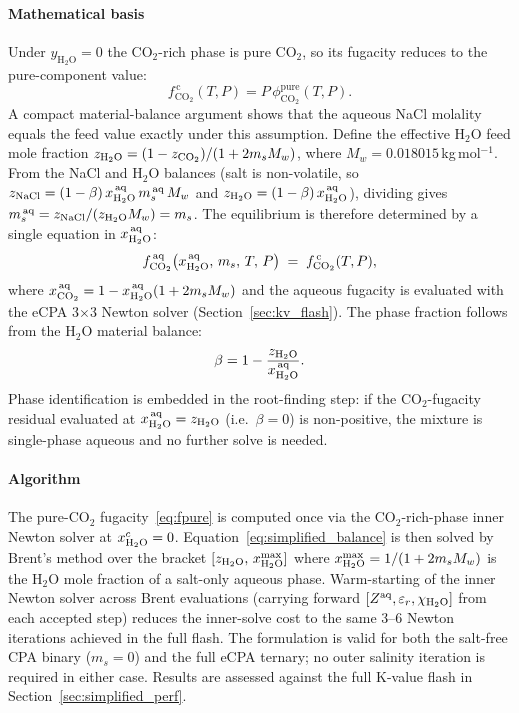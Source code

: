 \documentclass[preprint,12pt,number]{elsarticle}
\begin{document}
\paragraph{Mathematical basis}
Under $y_{\text{H}_2\text{O}} = 0$ the CO$_2$-rich phase is pure CO$_2$, so its fugacity
reduces to the pure-component value:
\begin{equation}
  f_{\text{CO}_2}^{\,\text{c}}(T,P) = P\,\phi_{\text{CO}_2}^{\text{pure}}(T,P).
  \label{eq:fpure}
\end{equation}
A compact material-balance argument shows that the aqueous NaCl molality equals the feed
value exactly under this assumption.
Define the effective H$_2$O feed mole fraction
$z_{\rm H_2O} = (1-z_{\text{CO}_2})/(1+2m_sM_w)$, where $M_w = 0.018015$\,kg\,mol$^{-1}$.
From the NaCl and H$_2$O balances (salt is non-volatile, so
$z_{\text{NaCl}} = (1-\beta)\,x_{\rm H_2O}^{\,\text{aq}}\,m_s^{\,\text{aq}}\,M_w$ and
$z_{\rm H_2O} = (1-\beta)\,x_{\rm H_2O}^{\,\text{aq}}$), dividing gives
$m_s^{\,\text{aq}} = z_{\text{NaCl}}/(z_{\rm H_2O} M_w) = m_s$.
The equilibrium is therefore determined by a single equation in $x_{\rm H_2O}^{\,\text{aq}}$:
\begin{equation}
  f_{\text{CO}_2}^{\,\text{aq}}\!\left(x_{\rm H_2O}^{\,\text{aq}},\,m_s,\,T,\,P\right)
  \;=\; f_{\text{CO}_2}^{\,\text{c}}(T,P),
  \label{eq:simplified_balance}
\end{equation}
where $x_{\rm CO_2}^{\,\text{aq}} = 1 - x_{\rm H_2O}^{\,\text{aq}}(1+2m_sM_w)$ and
the aqueous fugacity is evaluated with the eCPA 3$\times$3 Newton solver
(Section~\ref{sec:kv_flash}).
The phase fraction follows from the H$_2$O material balance:
\begin{equation}
  \beta = 1 - \frac{z_{\rm H_2O}}{x_{\rm H_2O}^{\,\text{aq}}}.
  \label{eq:beta_simplified}
\end{equation}
Phase identification is embedded in the root-finding step: if the CO$_2$-fugacity
residual evaluated at $x_{\rm H_2O}^{\,\text{aq}} = z_{\rm H_2O}$ (i.e.\ $\beta = 0$) is
non-positive, the mixture is single-phase aqueous and no further solve is needed.

\paragraph{Algorithm}
The pure-CO$_2$ fugacity~\eqref{eq:fpure} is computed once via the CO$_2$-rich-phase
inner Newton solver at $x_{\rm H_2O}^c = 0$.
Equation~\eqref{eq:simplified_balance} is then solved by Brent's method over the
bracket $[z_{\rm H_2O},\, x_{\rm H_2O}^{\max}]$ where $x_{\rm H_2O}^{\max} = 1/(1+2m_sM_w)$ is the
H$_2$O mole fraction of a salt-only aqueous phase.
Warm-starting of the inner Newton solver across Brent evaluations (carrying forward
$[Z^{\rm aq}, \varepsilon_r, \chi_{\rm H_2O}]$ from each accepted step) reduces the inner-solve
cost to the same 3--6 Newton iterations achieved in the full flash.
The formulation is valid for both the salt-free CPA binary ($m_s = 0$) and
the full eCPA ternary; no outer salinity iteration is required in either case.
Results are assessed against the full K-value flash in Section~\ref{sec:simplified_perf}.
\end{document}
